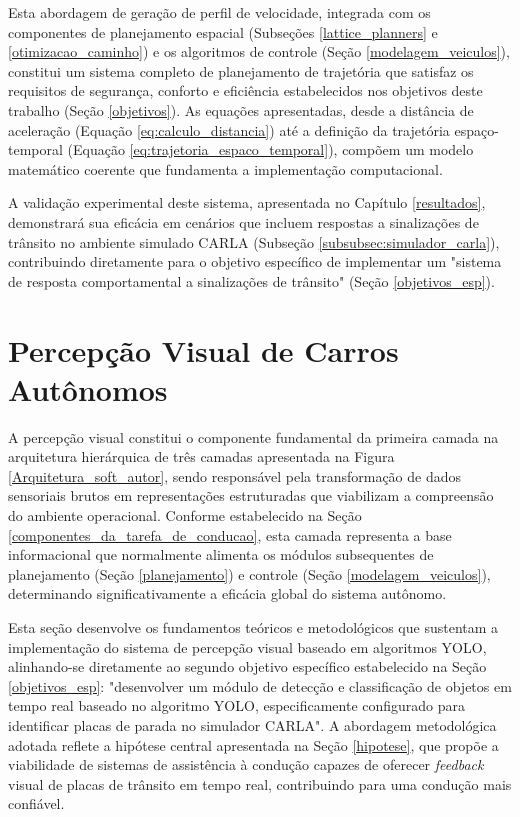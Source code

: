 Esta abordagem de geração de perfil de velocidade, integrada com os componentes de planejamento espacial (Subseções \ref{lattice_planners} e \ref{otimizacao_caminho}) e os algoritmos de controle (Seção \ref{modelagem_veiculos}), constitui um sistema completo de planejamento de trajetória que satisfaz os requisitos de segurança, conforto e eficiência estabelecidos nos objetivos deste trabalho (Seção \ref{objetivos}). As equações apresentadas, desde a distância de aceleração (Equação \ref{eq:calculo_distancia}) até a definição da trajetória espaço-temporal (Equação \ref{eq:trajetoria_espaco_temporal}), compõem um modelo matemático coerente que fundamenta a implementação computacional.

A validação experimental deste sistema, apresentada no Capítulo \ref{resultados}, demonstrará sua eficácia em cenários que incluem respostas a sinalizações de trânsito no ambiente simulado CARLA (Subseção \ref{subsubsec:simulador_carla}), contribuindo diretamente para o objetivo específico de implementar um "sistema de resposta comportamental a sinalizações de trânsito" (Seção \ref{objetivos_esp}).

\section{Percepção Visual de Carros Autônomos} \label{per_visual_carro}

A percepção visual constitui o componente fundamental da primeira camada na arquitetura hierárquica de três camadas apresentada na Figura \ref{Arquitetura_soft_autor}, sendo responsável pela transformação de dados sensoriais brutos em representações estruturadas que viabilizam a compreensão do ambiente operacional. Conforme estabelecido na Seção \ref{componentes_da_tarefa_de_conducao}, esta camada representa a base informacional que normalmente alimenta os módulos subsequentes de planejamento (Seção \ref{planejamento}) e controle (Seção \ref{modelagem_veiculos}), determinando significativamente a eficácia global do sistema autônomo.

Esta seção desenvolve os fundamentos teóricos e metodológicos que sustentam a implementação do sistema de percepção visual baseado em algoritmos YOLO, alinhando-se diretamente ao segundo objetivo específico estabelecido na Seção \ref{objetivos_esp}: "desenvolver um módulo de detecção e classificação de objetos em tempo real baseado no algoritmo YOLO, especificamente configurado para identificar placas de parada no simulador CARLA". A abordagem metodológica adotada reflete a hipótese central apresentada na Seção \ref{hipotese}, que propõe a viabilidade de sistemas de assistência à condução capazes de oferecer \textit{feedback} visual de placas de trânsito em tempo real, contribuindo para uma condução mais confiável.

